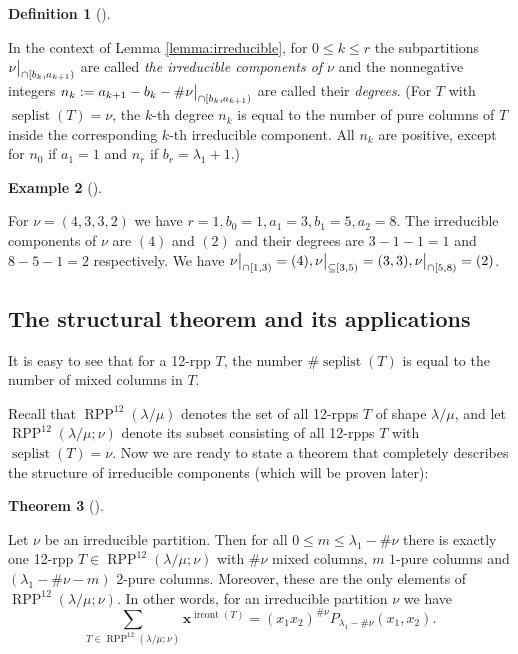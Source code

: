 \documentclass[numbers=enddot,12pt,final,onecolumn,notitlepage]{scrartcl}%
\theoremstyle{definition}
\newtheorem{theo}{Theorem}[section]
\newenvironment{theorem}[1][]
{\begin{theo}[#1]\begin{leftbar}}
{\end{leftbar}\end{theo}}
\newtheorem{defi}[theo]{Definition}
\newenvironment{definition}[1][]
{\begin{defi}[#1]\begin{leftbar}}
{\end{leftbar}\end{defi}}
\newtheorem{remk}[theo]{Remark}
\newenvironment{remark}[1][]
{\begin{remk}[#1]\begin{leftbar}}
{\end{leftbar}\end{remk}}
\newtheorem{exmp}[theo]{Example}
\newenvironment{example}[1][]
{\begin{exmp}[#1]\begin{leftbar}}
{\end{leftbar}\end{exmp}}
\let\sumnonlimits\sum
\renewcommand{\sum}{\sumnonlimits\limits}
\def\seplist{{\operatorname{seplist}}} %
\def\ircont{{\operatorname{ircont}}}
\def\seplistvar{{{\nu}}} %
\def\x{{\mathbf{x}}}
\def\lm{{\lambda/\mu}}
\def\OneTwoRPP{{\operatorname{RPP}^{12}\left(  \lambda/\mu\right)}}
\def\OneTwoRPPCutvar{{\operatorname{RPP}^{12}\left(  \lambda/\mu ;\seplistvar \right)}}
\begin{document}
\begin{definition}
 
 In the context of Lemma \ref{lemma:irreducible}, for $0\leq k\leq r$ the subpartitions $\nuxycap{b_k}{a_{k+1}}$ are called \textit{the irreducible components of $\seplistvar$} and the nonnegative integers $n_k:=a_{k+1}-b_k-\#\nuxycap{b_k}{a_{k+1}}$ are called their \textit{degrees}. (For $T$ with $\seplist(T)=\seplistvar$, the $k$-th degree $n_k$ is equal to the number of pure columns of $T$ inside the corresponding $k$-th irreducible component. All $n_k$ are positive, except for $n_0$ if $a_1 = 1$ and $n_r$ if $b_r = \lambda_1 + 1$.)
\end{definition}

\begin{example}
 For $\seplistvar=(4,3,3,2)$ we have $r=1,b_0=1,a_1=3,b_1=5,a_2=8$. The irreducible components of $\seplistvar$ are $(4)$ and $(2)$ and their degrees are $3-1-1=1$ and $8-5-1=2$ respectively. We have $\nuxycap{1}{3}=(4),\nuxy{3}{5}=(3,3),\nuxycap{5}{8}=(2)$.
\end{example}


\subsection{The structural theorem and its applications}
It is easy to see that for a 12-rpp $T$, the number $\#\seplist(T)$ is equal to the number of mixed columns in $T$.

Recall that $\OneTwoRPP$ denotes the set of all 12-rpps $T$ of shape $\lm$, and let $\OneTwoRPPCutvar$ denote its subset consisting of all 12-rpps $T$ with $\seplist(T)=\seplistvar$. Now we are ready to state a theorem that completely describes the structure of irreducible components (which will be proven later):
\begin{theorem}
\label{thm:12rpps}
 Let $\seplistvar$ be an irreducible partition. Then for all $0\leq m\leq \lambda_1-\#\seplistvar$ there is exactly one 12-rpp $T\in\OneTwoRPPCutvar$ with $\#\seplistvar$ mixed columns, $m$ $1$-pure columns and $(\lambda_1-\#\seplistvar-m)$ $2$-pure columns. Moreover, these are the only elements of $\OneTwoRPPCutvar$. In other words, for an irreducible partition $\seplistvar$ we have
  \begin{equation}
 \label{eq:thm12rpps}
 \sum_{T\in\OneTwoRPPCutvar} \x^{\ircont(T)}=(x_1x_2)^{\#\seplistvar} P_{\lambda_1-\#\seplistvar}(x_1,x_2).
 \end{equation}
\end{theorem}
\end{document}
